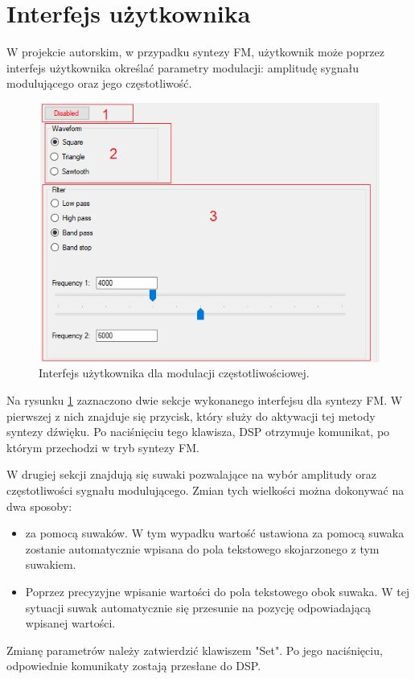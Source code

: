 \section{Interfejs użytkownika}
W projekcie autorskim, w przypadku syntezy FM, użytkownik może poprzez interfejs użytkownika określać parametry modulacji: amplitudę sygnału modulującego oraz jego częstotliwość.
\begin{figure}[H]
	\centering
	\includegraphics[width=12cm]{grafiki/sub_interface}
	\captionsetup{justification=centering}
	\caption{Interfejs użytkownika dla modulacji częstotliwościowej.}
	\label{rys:fm_interface}
\end{figure}
Na rysunku \ref{rys:fm_interface} zaznaczono dwie sekcje wykonanego interfejsu dla syntezy FM. W pierwszej z nich znajduje się przycisk, który służy do aktywacji tej metody syntezy dźwięku. Po naciśnięciu tego klawisza, DSP otrzymuje komunikat, po którym przechodzi w tryb syntezy FM.

W drugiej sekcji znajdują się suwaki pozwalające na wybór amplitudy oraz częstotliwości sygnału modulującego. Zmian tych wielkości można dokonywać na dwa sposoby:
\begin{itemize}
	\item za pomocą suwaków. W tym wypadku wartość ustawiona za pomocą suwaka zostanie automatycznie wpisana do pola tekstowego skojarzonego z tym suwakiem.
	\item Poprzez precyzyjne wpisanie wartości do pola tekstowego obok suwaka. W tej sytuacji suwak automatycznie się przesunie na pozycję odpowiadającą wpisanej wartości.
\end{itemize}
Zmianę parametrów należy zatwierdzić klawiszem "Set". Po jego naciśnięciu, odpowiednie komunikaty zostają przesłane do DSP.
